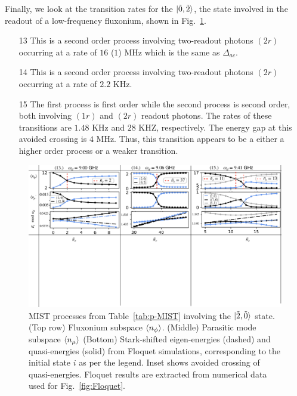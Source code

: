 \documentclass[%
reprint,
superscriptaddress,
 amsmath,amssymb,
 aps,
 prx,
longbibliography,
floatfix,
]{revtex4-2}
\begin{document}
Finally, we look at the transition rates for the $\ket{\tilde{0},\tilde{2}}$, the state involved in the readout of a low-frequency fluxonium, shown in Fig.~\ref{fig:Trans2}.
\begin{itemize}
    \item[13] This is a second order process involving two-readout photons $(2r)$ occurring at a rate of $16$ ($1$) MHz which is the same as $\Delta_{ac}$.
    \item[14] This is a second order process involving two-readout photons $(2r)$ occurring at a rate of $2.2$ KHz.
    \item[15] The first process is first order while the second process is second order, both involving $(1r)$ and $(2r)$ readout photons. The rates of these transitions are $1.48$ KHz and $28$ KHZ, respectively. The energy gap at this avoided crossing is $4$ MHz. Thus, this transition appears to be a either a higher order process or a weaker transition.
\end{itemize}
\begin{figure}
    \centering
    \includegraphics[width=1.0\textwidth]{Figures/Trans2.pdf}
    \caption{MIST processes from Table~\ref{tab:p-MIST} involving the $\ket{\tilde{2},\tilde{0}}$ state. (Top row) Fluxonium subspace $\braket{n_\phi}$. (Middle) Parasitic mode subspace $\braket{n_\mu}$ (Bottom) Stark-shifted eigen-energies (dashed) and quasi-energies (solid) from Floquet simulations, corresponding to the initial state $i$ as per the legend. Inset shows avoided crossing of quasi-energies. Floquet results are extracted from numerical data used for Fig.~\ref{fig:Floquet}.}
    \label{fig:Trans2}
\end{figure}
\end{document}
